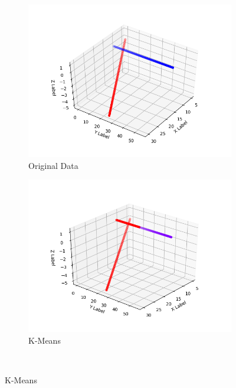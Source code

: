\documentclass[12pt]{article}
\begin{document}
\begin{enumerate}
\begin{figure}
    \centering
    \begin{subfigure}[b]{0.3\textwidth}
        \includegraphics[width=\textwidth]{ksubfigures/2lines.png}
        \caption{Original Data}
        \label{fig:2lines}
    \end{subfigure}
    \begin{subfigure}[b]{0.3\textwidth}
        \includegraphics[width=\textwidth]{ksubfigures/2lineskmeans.png}
        \caption{K-Means}
        \label{fig:kmeans}
    \end{subfigure}
    ~ %

\end{figure}
\end{enumerate}
\end{document}
